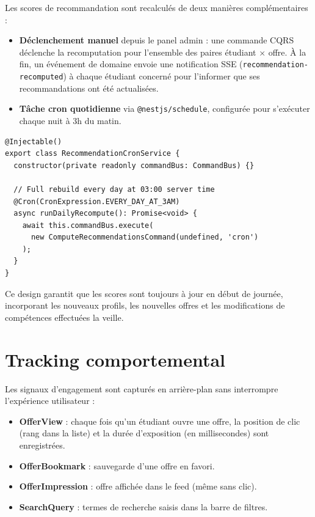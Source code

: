 ﻿\documentclass[12pt,a4paper]{report}
\begin{document}
Les scores de recommandation sont recalculés de deux manières complémentaires :

\begin{itemize}
  \item \textbf{Déclenchement manuel} depuis le panel admin : une commande CQRS déclenche la recomputation pour l'ensemble des paires étudiant × offre. À la fin, un événement de domaine envoie une notification SSE (\texttt{recommendation-recomputed}) à chaque étudiant concerné pour l'informer que ses recommandations ont été actualisées.
  \item \textbf{Tâche cron quotidienne} via \texttt{@nestjs/schedule}, configurée pour s'exécuter chaque nuit à 3h du matin.
\end{itemize}

\begin{lstlisting}[style=ts, caption={Cron job de recomputation quotidienne des recommandations}]
@Injectable()
export class RecommendationCronService {
  constructor(private readonly commandBus: CommandBus) {}

  // Full rebuild every day at 03:00 server time
  @Cron(CronExpression.EVERY_DAY_AT_3AM)
  async runDailyRecompute(): Promise<void> {
    await this.commandBus.execute(
      new ComputeRecommendationsCommand(undefined, 'cron')
    );
  }
}
\end{lstlisting}

Ce design garantit que les scores sont toujours à jour en début de journée, incorporant les nouveaux profils, les nouvelles offres et les modifications de compétences effectuées la veille.

\section{Tracking comportemental}

Les signaux d'engagement sont capturés en arrière-plan sans interrompre l'expérience utilisateur :

\begin{itemize}
  \item \textbf{OfferView} : chaque fois qu'un étudiant ouvre une offre, la position de clic (rang dans la liste) et la durée d'exposition (en millisecondes) sont enregistrées.
  \item \textbf{OfferBookmark} : sauvegarde d'une offre en favori.
  \item \textbf{OfferImpression} : offre affichée dans le feed (même sans clic).
  \item \textbf{SearchQuery} : termes de recherche saisis dans la barre de filtres.
\end{itemize}
\end{document}
